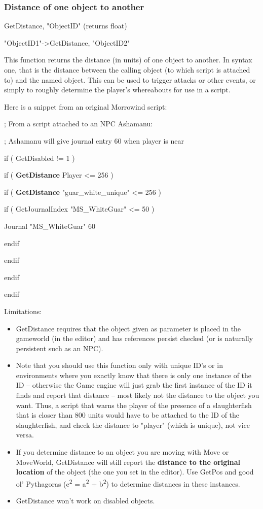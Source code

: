 \documentclass[
]{article}
\begin{document}
\hypertarget{distance-of-one-object-to-another}{%
\subsubsection{Distance of one object to
another}\label{distance-of-one-object-to-another}}

GetDistance, "ObjectID" (returns float)

"ObjectID1"-\textgreater GetDistance, "ObjectID2"

This function returns the distance (in units) of one object to another.
In syntax one, that is the distance between the calling object (to which
script is attached to) and the named object. This can be used to trigger
attacks or other events, or simply to roughly determine the player's
whereabouts for use in a script.

Here is a snippet from an original Morrowind script:

; From a script attached to an NPC Ashamanu:

; Ashamanu will give journal entry 60 when player is near

if ( GetDisabled != 1 )

if ( \textbf{GetDistance} Player \textless= 256 )

if ( \textbf{GetDistance} "guar\_white\_unique" \textless= 256 )

if ( GetJournalIndex "MS\_WhiteGuar" \textless= 50 )

Journal "MS\_WhiteGuar" 60

endif

endif

endif

endif

Limitations:

\begin{itemize}
\item
  GetDistance requires that the object given as parameter is placed in
  the gameworld (in the editor) and has references persist checked (or
  is naturally persistent such as an NPC).
\item
  Note that you should use this function only with unique ID's or in
  environments where you exactly know that there is only one instance of
  the ID -- otherwise the Game engine will just grab the first instance
  of the ID it finds and report that distance -- most likely not the
  distance to the object you want. Thus, a script that warns the player
  of the presence of a slaughterfish that is closer than 800 units would
  have to be attached to the ID of the slaughterfish, and check the
  distance to "player" (which is unique), not vice versa.
\item
  If you determine distance to an object you are moving with Move or
  MoveWorld, GetDistance will still report the \textbf{distance to the
  original location} of the object (the one you set in the editor). Use
  GetPos and good ol' Pythagoras (c\textsuperscript{2} =
  a\textsuperscript{2} + b\textsuperscript{2}) to determine distances in
  these instances.
\item
  GetDistance won't work on disabled objects.
\end{itemize}
\end{document}
